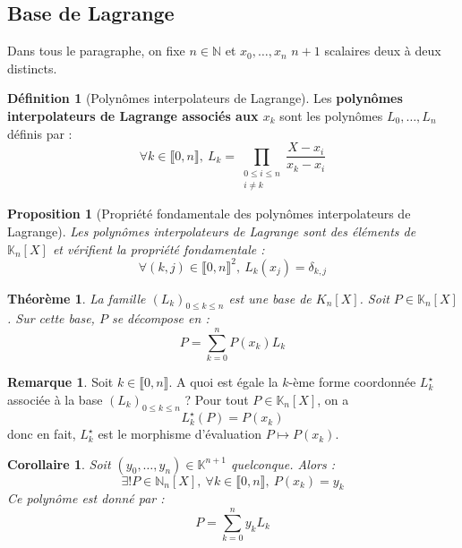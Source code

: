 \documentclass[french]{book}
\newcommand{\N}{\mathbb{N}}
\newcommand{\K}{\mathbb{K}}
\newcommand{\st}{^\star}
\theoremstyle{plain}
\newtheorem{thm}{Théorème}[chapter]
\newtheorem{prop}{Proposition}[chapter]
\newtheorem{cor}{Corollaire}[chapter]
\theoremstyle{definition}
\newtheorem{dfn}{Définition}[chapter]
\newtheorem{rmq}{Remarque}[chapter]
\theoremstyle{remark}
\begin{document}
\subsection{Base de Lagrange}
Dans tous le paragraphe, on fixe $n\in\N$ et $x_0,\ldots,x_n$ $n+1$ scalaires deux à deux distincts.
\begin{dfn}[Polynômes interpolateurs de Lagrange]
	Les \textbf{polynômes interpolateurs de Lagrange associés aux $x_k$} sont les polynômes $L_0,\ldots,L_n$ définis par : $$\forall k\in\llbracket0,n\rrbracket,\ L_k=\prod_{\substack{0\leqslant i\leqslant n \\ i\ne k}}\frac{X-x_i}{x_k-x_i}$$
\end{dfn}
\begin{prop}[Propriété fondamentale des polynômes interpolateurs de Lagrange]
	Les polynômes interpolateurs de Lagrange sont des éléments de $\K_n[X]$ et vérifient la propriété fondamentale : $$\forall (k,j)\in\llbracket0,n\rrbracket^2,\ L_k(x_j)=\delta_{k,j}$$
\end{prop}
\begin{thm}
	La famille $(L_k)_{0\leqslant k\leqslant n}$ est une base de $K_n[X]$. Soit $P\in\K_n[X]$. Sur cette base, $P$ se décompose en : $$P=\sum_{k=0}^{n}P(x_k)L_k$$
\end{thm}
\begin{rmq}
	Soit $k\in\llbracket0,n\rrbracket$. A quoi est égale la $k$-ème forme coordonnée $L_k\st$ associée à la base $(L_k)_{0\leqslant k\leqslant n}$ ? Pour tout $P\in\K_n[X]$, on a $$L_k\st(P)=P(x_k)$$ donc en fait, $L_k\st$ est le morphisme d'évaluation $P\mapsto P(x_k)$.
\end{rmq}
\begin{cor}
	Soit $(y_0,\ldots,y_n)\in\K^{n+1}$ quelconque. Alors : $$\exists!P\in\N_n[X],\ \forall k\in\llbracket0,n\rrbracket,\ P(x_k)=y_k$$ Ce polynôme est donné par : $$P=\sum_{k=0}^{n}y_kL_k$$
\end{cor}
\end{document}
